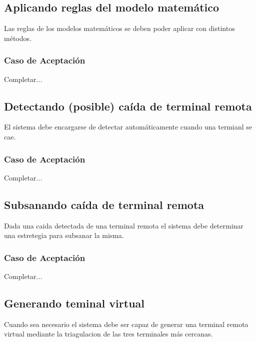\linea \subsection*{Aplicando reglas del modelo matemático}
Las reglas de los modelos matemáticos se deben poder aplicar con distintos métodos.
\subsubsection*{Caso de Aceptación}
Completar...

\linea \subsection*{Detectando (posible) caída de terminal remota}
El sistema debe encargarse de detectar automáticamente cuando una termianl se cae.
\subsubsection*{Caso de Aceptación}
Completar...

\linea \subsection*{Subsanando caída de terminal remota}
Dada una caida detectada de una terminal remota el sistema debe determinar una estretegia para subsanar la misma.
\subsubsection*{Caso de Aceptación}
Completar...

\linea \subsection*{Generando teminal virtual}
Cuando sea necesario el sistema debe ser capaz de generar una terminal remota virtual 
mediante la triagulacion de las tres terminales más cercanas.

